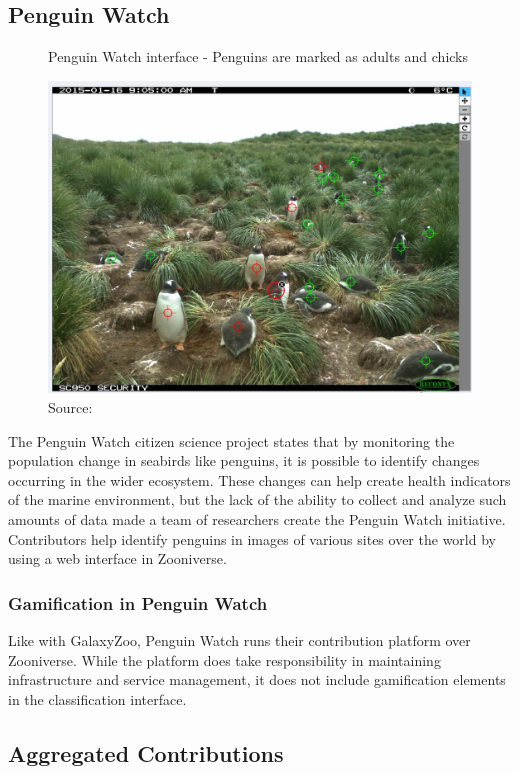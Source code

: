 \subsection{Penguin Watch}

\begin{figure}[ht]
    \centering
    \caption{Penguin Watch interface - Penguins are marked as adults and chicks}
    \includegraphics[width=0.8\linewidth]{images/background/penguinwatch.jpg}
    \caption*{Source: \cite{penguin2015watch}}
    \label{fig:oldweather-logbook}
\end{figure}

The Penguin Watch citizen science project states that by monitoring the population change in seabirds like penguins, it is possible to identify changes occurring in the wider ecosystem. These changes can help create health indicators of the marine environment, but the lack of the ability to collect and analyze such amounts of data made a team of researchers create the Penguin Watch initiative. Contributors help identify penguins in images of various sites over the world by using a web interface in Zooniverse.

\subsubsection{Gamification in Penguin Watch}

Like with GalaxyZoo, Penguin Watch runs their contribution platform over Zooniverse. While the platform does take responsibility in maintaining infrastructure and service management, it does not include gamification elements in the classification interface.

\subsection{Aggregated Contributions}

